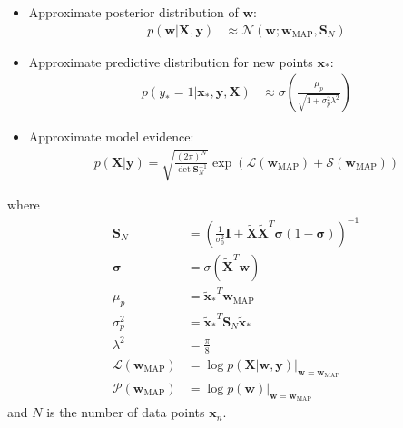 \documentclass[a4paper]{article}
\begin{document}
    \begin{itemize}
        \item Approximate posterior distribution of $\bm{w}$:
        \begin{align}
            p(\bm{w} | \bm{X}, \bm{y}) &\approx \mathcal{N}(\bm{w}; \bm{w}_\text{MAP}, \bm{S}_N)
        \end{align}
        \noindent
        \item Approximate predictive distribution for new points $\bm{x}_*$:
        \begin{align}
            p(y_* = 1 | \bm{x}_*, \bm{y}, \bm{X}) &\approx \sigma\left(\frac{\mu_p}{\sqrt{1 + \sigma_p^2\lambda^2}}\right)
        \end{align}
        \item Approximate model evidence:
        \begin{align}
            p(\bm{X} | \bm{y}) = \sqrt{\frac{(2\pi)^N}{\det \bm{S}_N^{-1}}}
                                 \exp \left(\mathcal{L}(\bm{w}_\text{MAP}) + \mathcal{S}(\bm{w}_\text{MAP})\right)
        \end{align}
    \end{itemize}
    where
    \begin{align}
        \bm{S}_N &= \left(\frac{1}{\sigma_0^2}\bm{I} + \tilde{\bm{X}}\tilde{\bm{X}}^T \bm{\sigma} (1 - \bm{\sigma})\right)^{-1} \\
        \bm{\sigma} &= \sigma(\tilde{\bm{X}}^T \bm{w}) \\
        \mu_p &= {\tilde{\bm{x}}_*}^T \bm{w}_\text{MAP} \\
        \sigma_p^2 &= {\tilde{\bm{x}}_*}^T \bm{S}_N \tilde{\bm{x}}_* \\
        \lambda^2 &= \frac{\pi}{8} \\
        \mathcal{L}(\bm{w}_\text{MAP}) &= \log p(\bm{X} | \bm{w}, \bm{y}) \big|_{\bm{w} = \bm{w}_\text{MAP}} \\
        \mathcal{P}(\bm{w}_\text{MAP}) &= \log p(\bm{w}) \big|_{\bm{w} = \bm{w}_\text{MAP}}
    \end{align}
    and $N$ is the number of data points $\bm{x}_n$.
\end{document}

